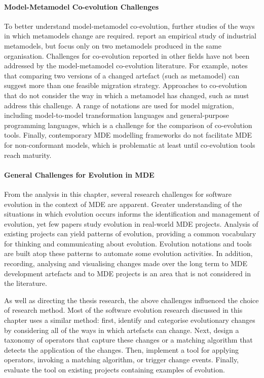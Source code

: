 \paragraph{Model-Metamodel Co-evolution Challenges} To better understand model-metamodel co-evolution, further studies of the ways in which metamodels change are required. \cite{herrmannsdoerfer08automatability} report an empirical study of industrial metamodels, but focus only on two metamodels produced in the same organisation. Challenges for co-evolution reported in other fields have not been addressed by the model-metamodel co-evolution literature. For example, \cite{lerner00model} notes that comparing two versions of a changed artefact (such as metamodel) can suggest more than one feasible migration strategy. Approaches to co-evolution that do not consider the way in which a metamodel has changed, such as \cite{cicchetti08automating,garces09managing} must address this challenge. A range of notations are used for model migration, including model-to-model transformation languages and general-purpose programming languages, which is a challenge for the comparison of co-evolution tools. Finally, contemporary MDE modelling frameworks do not facilitate MDE for non-conformant models, which is problematic at least until co-evolution tools reach maturity.  

\paragraph{General Challenges for Evolution in MDE} From the analysis in this chapter, several research challenges for software evolution in the context of MDE are apparent. Greater understanding of the situations in which evolution occurs informs the identification and management of evolution, yet few papers study evolution in real-world MDE projects. Analysis of existing projects can yield patterns of evolution, providing a common vocabulary for thinking and communicating about evolution. Evolution notations and tools are built atop these patterns to automate some evolution activities. In addition, recording, analysing and visualising changes made over the long term to MDE development artefacts and to MDE projects is an area that is not considered in the literature.

As well as directing the thesis research, the above challenges influenced the choice of research method. Most of the software evolution research discussed in this chapter uses a similar method: first, identify and categorise evolutionary changes by considering all of the ways in which artefacts can change. Next, design a taxonomy of operators that capture these changes or a matching algorithm that detects the application of the changes. Then, implement a tool for applying operators, invoking a matching algorithm, or trigger change events. Finally, evaluate the tool on existing projects containing examples of evolution.

